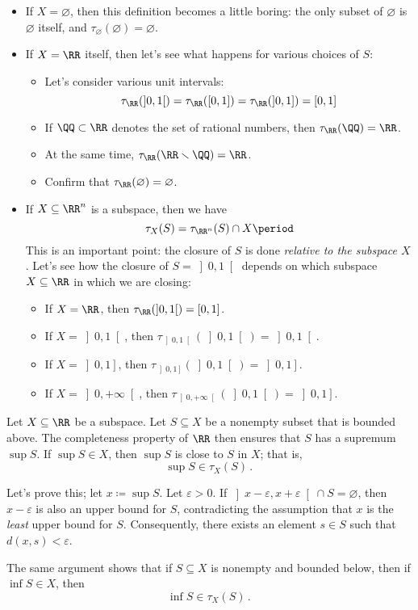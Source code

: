 \begin{exm}
	\begin{itemize}
		\item If $ X = \varnothing $, then this definition becomes a little boring:
			the only subset of $\varnothing$ is $\varnothing$ itself, and $\tau_{\varnothing}(\varnothing) = \varnothing$.
		\item If $ X = \RR$ itself, then let's see what happens for various choices of $S$:
			\begin{itemize}
				\item Let's consider various unit intervals:
					\[
						\tau_{\RR}(\left]0,1\right[) = \tau_{\RR}([0,1]) = \tau_{\RR}(\left]0,1\right]) = [0,1]
					\]
				\item If $\QQ \subset \RR$ denotes the set of rational numbers, then $\tau_{\RR}(\QQ) = \RR $.
				\item At the same time, $\tau_{\RR}(\RR \smallsetminus \QQ) = \RR$.
				\item Confirm that  $\tau_{\RR}(\varnothing)=\varnothing$.
			\end{itemize}
		\item If $ X \subseteq \RR^n$ is a subspace, then we have
			\[
				\tau_X(S) = \tau_{\RR^n}(S) \cap X \period
			\]
			This is an important point: the closure of $S$ is done \emph{relative to the subspace $X$}.
			Let's see how the closure of $S = \left]0,1\right[$ depends on which subspace $X \subseteq \RR $ in which we are closing:
			\begin{itemize}
				\item If $X=\RR$, then $\tau_{\RR}(\left]0,1\right[) = [0,1]$.
				\item If $X=\left]0,1\right[$, then $\tau_{\left]0,1\right[}(\left]0,1\right[) = \left]0,1\right[$.
				\item If $X=\left]0,1\right]$, then $\tau_{\left]0,1\right]}(\left]0,1\right[) = \left]0,1\right]$.
				\item If $X=\left]0,+\infty\right[$, then $\tau_{\left]0,+\infty\right[}(\left]0,1\right[) = \left]0,1\right]$.
			\end{itemize}
	\end{itemize}
\end{exm}

\begin{exm}
	Let $X \subseteq \RR$ be a subspace.
	Let $S \subseteq X$ be a nonempty subset that is bounded above.
	The completeness property of $\RR$ then ensures that $S$ has a supremum $\sup S$.
	If $\sup S \in X$, then $\sup S$ is close to $S$ in $X$;
	that is,
	\[
		\sup S \in \tau_X(S) \period
	\]

	Let's prove this; let $x\coloneq \sup S$.
	Let $\varepsilon>0$.
	If $ \left]x-\varepsilon, x+\varepsilon\right[ \cap S = \varnothing$, then $x-\varepsilon$ is also an upper bound for $S$, contradicting the assumption that $x$ is the \emph{least} upper bound for $S$.
	Consequently, there exists an element $ s \in S$ such that $d(x,s) < \varepsilon$.

	The same argument shows that if $S \subseteq X $ is nonempty and bounded below, then if $\inf S \in X$, then
	\[
		\inf S \in \tau_X(S) \period
	\]
\end{exm}

